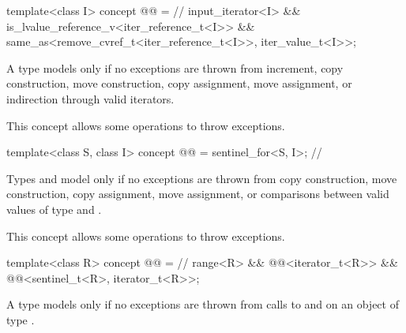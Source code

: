 \begin{itemdecl}
template<class I>
concept @@ = // \expos
  input_iterator<I> &&
  is_lvalue_reference_v<iter_reference_t<I>> &&
  same_as<remove_cvref_t<iter_reference_t<I>>, iter_value_t<I>>;
\end{itemdecl}

\begin{itemdescr}
\pnum
A type  models  only if
no exceptions are thrown from increment,
copy construction, move construction,
copy assignment, move assignment,
or indirection through valid iterators.

\pnum
\begin{note}
This concept allows some 
operations to throw exceptions.
\end{note}
\end{itemdescr}

\begin{itemdecl}
template<class S, class I>
concept @@ = sentinel_for<S, I>; // \expos
\end{itemdecl}

\begin{itemdescr}
\pnum
Types  and  model 
only if no exceptions are thrown from copy construction, move construction,
copy assignment, move assignment, or comparisons between
valid values of type  and .

\pnum
\begin{note}
This concept allows some 
operations to throw exceptions.
\end{note}
\end{itemdescr}

\begin{itemdecl}
template<class R>
concept @@ = // \expos
  range<R> &&
  @@<iterator_t<R>> &&
  @@<sentinel_t<R>, iterator_t<R>>;
\end{itemdecl}

\begin{itemdescr}
\pnum
A type  models  only if
no exceptions are thrown from calls to  and
 on an object of type .
\end{itemdescr}

